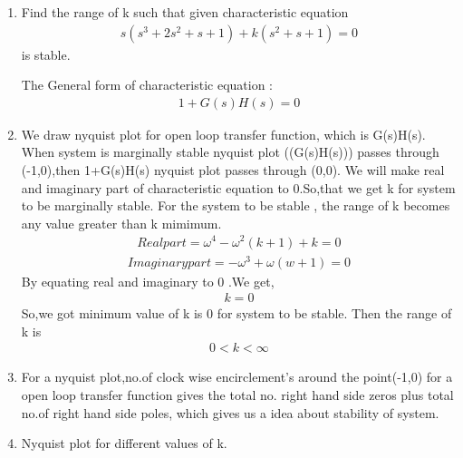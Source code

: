 \begin{enumerate}[label=\thesubsection.\arabic*.,ref=\thesubsection.\theenumi]
\item Find the range of k such that given characteristic equation
\begin{align}
s(s^3+2s^2+s+1) +k(s^2+s+1) = 0
\label{eq:ee18btech11042_1}
\end{align}
is stable.

\solution
The General form of characteristic equation :
\begin{align}
1+G(s)H(s) = 0
\label{eq:ee18btech11042_2}    
\end{align}
\item  We draw nyquist plot for open loop transfer function, which is G(s)H(s). When system is marginally stable nyquist plot ((G(s)H(s))) passes through (-1,0),then 1+G(s)H(s) nyquist plot passes through (0,0). We will make real and imaginary part of characteristic equation to 0.So,that  we  get  k for system to be  marginally stable. For the system to be stable , the range of k becomes any value greater than k mimimum.
\begin{align}
Real part = \omega^4 - \omega^2(k+1) +k = 0
\label{eq:ee18btech11042_3}
\end{align}
\begin{align}
Imaginary part = -\omega^3 +\omega(w+1) = 0
\label{eq:ee18btech11042_4}
\end{align}
By equating real and imaginary to 0 .We get,
\begin{align}
 k = 0
\label{eq:ee18btech11042_5}
\end{align}
So,we got minimum value of k is 0 for system to be stable. Then the range of k is
\begin{align}
0<k<\infty
\label{eq:ee18btech11042_6}
\end{align}

\item For a nyquist plot,no.of clock wise encirclement's around the point(-1,0) for a open loop transfer function gives the total no. right hand side  zeros plus total no.of right hand side poles, which gives us a idea about stability of system.
\item   Nyquist plot for different values of k.


\end{enumerate}

